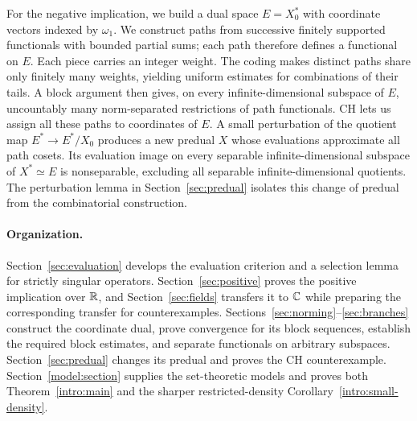 For the negative implication, we build a dual space $E=X_0^*$ with
coordinate vectors indexed by $\omega_1$. We construct paths from
successive finitely supported functionals with bounded partial sums;
each path therefore defines a functional on $E$. Each piece carries
an integer weight. The coding makes distinct paths share only finitely
many weights, yielding uniform estimates for combinations of their
tails. A block argument
then gives, on every infinite-dimensional subspace of $E$, uncountably
many norm-separated restrictions of path functionals. CH lets us assign
all these paths to coordinates of $E$. A small perturbation of the
quotient map $E^*\to E^*/X_0$ produces a new predual $X$ whose evaluations
approximate all path cosets. Its evaluation image on every separable
infinite-dimensional subspace of $X^*\simeq E$ is nonseparable, excluding
all separable infinite-dimensional quotients. The perturbation lemma in
Section~\ref{sec:predual} isolates this change of predual from the
combinatorial construction.

\paragraph{Organization.}
Section~\ref{sec:evaluation} develops the evaluation criterion and a
selection lemma for strictly singular operators.
Section~\ref{sec:positive} proves the positive implication over $\mathbb R$,
and Section~\ref{sec:fields} transfers it to $\mathbb C$ while preparing the
corresponding transfer for counterexamples.
Sections~\ref{sec:norming}--\ref{sec:branches} construct the coordinate
dual, prove convergence for its block sequences, establish the required
block estimates, and separate functionals on arbitrary subspaces.
Section~\ref{sec:predual} changes its predual and proves the CH
counterexample. Section~\ref{model:section} supplies the set-theoretic models and
proves both Theorem~\ref{intro:main} and the sharper restricted-density
Corollary~\ref{intro:small-density}.
